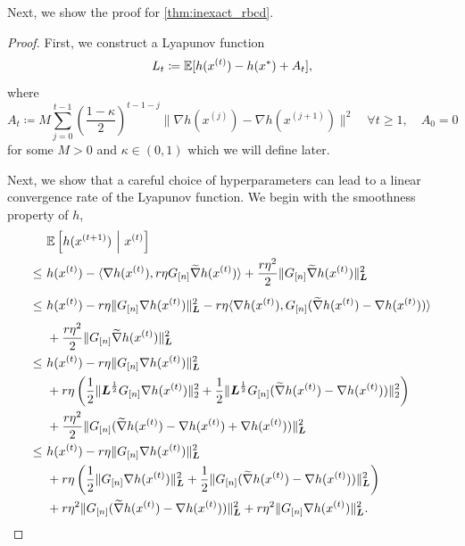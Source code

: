 Next, we show the proof for \autoref{thm:inexact_rbcd}.

\begin{proof}
    First, we construct a Lyapunov function 
    \[L_t \coloneqq \mathbb{E}[ h(x^{(t)}) - h(x^*) + A_t],\]
    where 
    \[A_t \coloneqq  M \sum_{j=0}^{t-1} \left(\frac{1-\kappa}{2}\right)^{t-1-j} \| \nabla h(x^{(j)}) - {\nabla} h(x^{(j+1)}) \|^2 \quad \forall t \geq 1, \quad A_0 = 0\]
    for some $M > 0$ and $\kappa \in (0,1)$ which we will define later. 
    
    Next, we show that a careful choice of hyperparameters can lead to a linear convergence rate of the Lyapunov function. We begin with the smoothness property of $h$,
    \begin{equation} \label{eq:decompose}
    \begin{split}
        &\mE \left[ h( x^{(t+1)} ) ~\Big|~ x^{(t)} \right] \\
        \leq~& h( x^{(t)} ) - \langle \nabla h(x^{(t)}), r \eta G_{[n]} \wt{\nabla} h(x^{(t)}) \rangle + \frac{r \eta^2}{2} \|  G_{[n]} \wt{\nabla} h(x^{(t)}) \|_{\bL}^2 \\
        \leq~& h(x^{(t)}) - r \eta \| G_{[n]} \nabla h(x^{(t)}) \|_{\bL}^2  -  \vphantom{\frac{r \eta^2 L_{\max}}{2}} r \eta \langle \nabla h(x^{(t)}), G_{[n]} ( \wt{\nabla} h(x^{(t)}) - \nabla h(x^{(t)}) ) \rangle \\
        &+ \frac{r \eta^2 }{2} \| G_{[n]} \wt{\nabla} h(x^{(t)})\|_{\bL}^2 \\
        \leq~& h(x^{(t)}) - r \eta \| G_{[n]} \nabla h(x^{(t)}) \|_{\bL}^2 \\
        &+ r \eta \left( \frac{1}{2} \| \bL^{\frac{1}{2}} G_{[n]} \nabla h(x^{(t)}) \|_{2}^2 + \frac{1}{2} \| \bL^{\frac{1}{2}} G_{[n]} ( \wt{\nabla} h(x^{(t)}) - \nabla h(x^{(t)}) )  \|_2^2 \right) \\
        &+ \frac{r \eta^2 }{2} \| G_{[n]} ( \wt{\nabla} h(x^{(t)}) - \nabla h(x^{(t)}) + \nabla h(x^{(t)}) ) \|_{\bL}^2 \\
        \leq~& h(x^{(t)}) - r \eta \| G_{[n]} \nabla h(x^{(t)}) \|_{\bL}^2 \\
        &+ r \eta \left( \frac{1}{2} \| G_{[n]} \nabla h(x^{(t)}) \|_{\bL}^2 + \frac{1}{2} \| G_{[n]} ( \wt{\nabla} h(x^{(t)}) - \nabla h(x^{(t)}) )  \|_{\bL}^2 \right) \\
        &+ r \eta^2 \| G_{[n]} ( \wt{\nabla} h(x^{(t)}) - \nabla h(x^{(t)} ) ) \|_{\bL}^2 + r \eta^2 \| G_{[n]} \nabla h(x^{(t)}) \|_{\bL}^2.
    \end{split}

\end{equation}
\end{proof}
